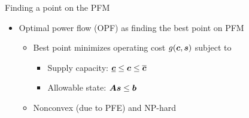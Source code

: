 \begin{frame}[t]{Finding a point on the PFM}{}
\begin{itemize}
        \vspace{0.5em}
        \item <3-> \textcolor<3>{CornellRed}{Optimal power flow} (OPF)
            as finding the best point on PFM
        \begin{itemize}
            \item Best point minimizes \textcolor<3>{CornellRed}{operating cost \(g\!\OPFVars\)}
                subject to
            \begin{itemize}
                \item Supply capacity:
                    \(\underline{\boldsymbol{c}} \leq \boldsymbol{c} \leq \overline{\boldsymbol{c}}\)
                \item Allowable state:
                    \(\RealMat{A}\BusVolts \leq \RealVec{b}\)
            \end{itemize}

            \item \textcolor<3>{CornellRed}{Nonconvex} (due to PFE)
                and \textcolor<3>{CornellRed}{NP-hard}
                \cite{LavaeiLow2012,Lehmann+2016,BienstockVerma2019}
        \end{itemize}
    \end{itemize}
\end{frame}

